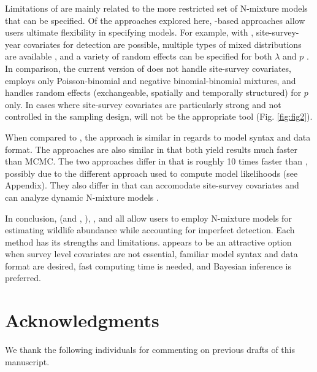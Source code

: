 \documentclass[article]{jss}
\begin{document}
Limitations of  are mainly related to the more restricted set of N-mixture models that can be specified.  Of the approaches explored here, -based approaches allow users ultimate flexibility in specifying models. For example, with , site-survey-year covariates for detection are possible, multiple types of mixed distributions are available \citep{Joseph_Elkin_Martin_Possingham_2009,Martin_Royle_Mackenzie_Edwards_Kery_Gardner_2011}, and a variety of random effects can be specified for both $\lambda$ and $p$ \citep{Kery_Schaub_2011}.  In comparison, the current version of  does not handle site-survey covariates, employs only Poisson-binomial and negative binomial-binomial mixtures, and handles random effects (exchangeable, spatially and temporally structured) for $p$ only.  In cases where site-survey covariates are particularly strong and not controlled in the sampling design,  will not be the appropriate tool (Fig. \ref{fig:fig2}).

When compared to , the  approach is similar in regards to model syntax and data format.  The approaches are also similar in that both yield results much faster than MCMC.  The two approaches differ in that  is roughly 10 times faster than , possibly due to the different approach used to compute model likelihoods (see Appendix).  They also differ in that  can accomodate site-survey covariates and can analyze dynamic N-mixture models \citep{Chandler_Royle_King_2011, Dail_Madsen_2011}.

In conclusion,  (and , ), , and  all allow users to employ N-mixture models for estimating wildlife abundance while accounting for imperfect detection.  Each method has its strengths and limitations.   appears to be an attractive option when survey level covariates are not essential, familiar model syntax and data format are desired, fast computing time is needed, and Bayesian inference is preferred.

\section*{Acknowledgments}
We thank the following individuals for commenting on previous drafts of this manuscript.



\appendix
\end{document}
